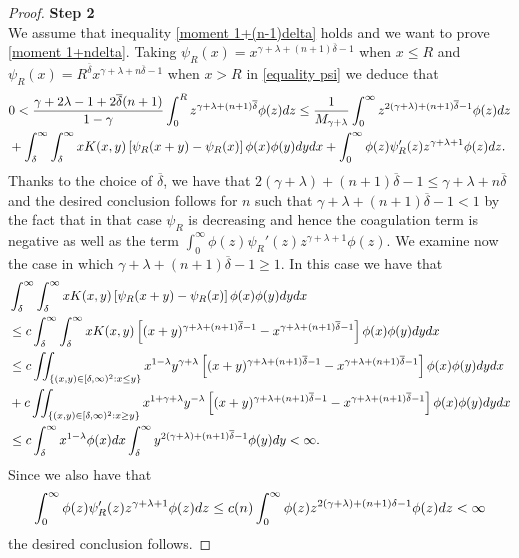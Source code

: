 \documentclass[11pt]{article}
\numberwithin{equation}{section}
\theoremstyle{plain}
\newcommand{\der}{\textup{d}}
\begin{document}
\begin{proof}
		\textbf{Step 2} \\
		We assume that inequality \eqref{moment 1+(n-1)delta} holds and we want to prove \eqref{moment 1+ndelta}.
		Taking $\psi_R(x)= x^{\gamma + \lambda + (n+1) \overline \delta-1 }$ when $x \leq R$ and $\psi_R(x)= R^{\overline \delta} x^{\gamma + \lambda + n \overline \delta-1 }$ when $x > R$ in \eqref{equality psi} we deduce that
			\begin{align*}
&0 <\frac{\gamma+2\lambda -1 +2\overline \delta (n+1 )}{1-\gamma } \int_0^R z^{\gamma + \lambda + (n+1)\overline \delta }  \phi(z) \der z \leq \frac{1}{M_{\gamma+\lambda} } \int_0^\infty z^{2(\gamma+\lambda)+(n+1) \overline \delta -1 } \phi(z) \der z \\
&+ \int_\delta^\infty \int_\delta^\infty  x K(x,y) \left[\psi_R(x+y)-\psi_R(x) \right] \phi(x) \phi(y) \der y \der x + \int_0^\infty \phi(z) \psi_R'(z) z^{\gamma+\lambda+1} \phi(z) \der z .
		\end{align*}
Thanks to the choice of $\overline \delta $, we have that $2(\gamma+\lambda)+(n+1) \overline \delta -1 \leq 	\gamma+\lambda+ n \overline \delta $
	and the desired conclusion follows for $n$ such that $\gamma+\lambda +(n+1)\overline \delta-1 < 1$ by the fact that in that case $\psi_R$ is decreasing and hence the coagulation term is negative as well as the term $\int_0^\infty \phi(z) \psi_R'(z) z^{\gamma+\lambda+1} \phi(z)$. 
	We examine now the case in which $\gamma+\lambda +(n+1)\overline \delta-1 \geq 1$.
	In this case we have that 
	\begin{align*}
&\int_\delta^\infty \int_\delta^\infty x K(x,y) \left[\psi_R(x+y)-\psi_R(x) \right] \phi(x) \phi(y) \der y \der x \\
&\leq c  \int_\delta^\infty \int_\delta^\infty  x K(x,y) \left[(x+y)^{\gamma+\lambda +(n+1) \overline \delta -1} -x^{\gamma+\lambda +(n+1) \overline \delta -1} \right] \phi(x) \phi(y) \der y \der x \\
& \leq c 
\iint_{\{(x,y) \in[\delta, \infty )^{2} : x \leq y\}}  x^{1-\lambda } y^{\gamma+\lambda}  \left[(x+y)^{\gamma+\lambda +(n+1) \overline \delta -1} -x^{\gamma+\lambda +(n+1) \overline \delta -1} \right] \phi(x) \phi(y) \der y \der x\\
&+ c 
\iint_{\{(x,y) \in [\delta, \infty )^{2} : x \geq y\}}  x^{1+\gamma +\lambda } y^{-\lambda}  \left[(x+y)^{\gamma+\lambda +(n+1) \overline \delta -1} -x^{\gamma+\lambda +(n+1) \overline \delta -1} \right] \phi(x) \phi(y) \der y \der x \\
& \leq c \int_\delta^\infty x^{1-\lambda} \phi(x) \der x \int_\delta^\infty y^{2(\gamma+\lambda) +(n+1) \overline \delta -1 } \phi(y) \der y < \infty.
\end{align*} 
Since we also have that
\begin{align*}
    \int_0^\infty \phi(z) \psi_R'(z) z^{\gamma+\lambda+1} \phi(z) \der z \leq c(n)   \int_0^\infty \phi(z)  z^{2(\gamma+\lambda) + (n+1)\delta -1} \phi(z) \der z < \infty
\end{align*}
the desired conclusion follows.
	\end{proof}
\end{document}
